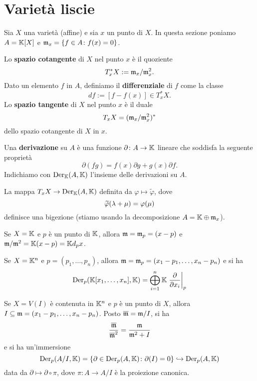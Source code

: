 \section{Variet\`a liscie}
\begin{notation}
Sia $X$ una varietà (affine) e sia $x$ un punto di $X$. In questa sezione poniamo $A=\mathbb{K}[X]$ e $\mathfrak{m}_x=\{f\in A\colon f(x)=0\}$.
\end{notation}


\begin{definition}
    Lo \textbf{spazio cotangente} di $X$ nel punto $x$ è il quoziente 
    \[T^\ast_x X:= \mathfrak{m}_x/\mathfrak{m}_x^2.\]
    Dato un elemento $f$ in $A$, definiamo il \textbf{differenziale} di $f$ come la classe 
    \[df:= [f-f(x)]\in T^\ast_x X.\] 
    Lo \textbf{spazio tangente} di $X$ nel punto $x$ è il duale 
    \[T_x X=(\mathfrak{m}_x/\mathfrak{m}_x^2)^\ast\]
    dello spazio cotangente di $X$ in $x$.
\end{definition}

\begin{definition}
    Una \textbf{derivazione} su $A$ è una funzione $\partial\colon A \to \mathbb{K}$ lineare che soddisfa la seguente proprietà \[\partial(fg)=f(x)\partial g + g(x)\partial f.\]
    Indichiamo con $\operatorname{Der}_{\mathbb{K}}(A,\mathbb{K})$ l'insieme delle derivazioni su $A$.
\end{definition}

\begin{exercise}
    La mappa $T_xX \to \operatorname{Der}_{\mathbb{K}}(A,\mathbb{K})$ definita da $\varphi\mapsto \widetilde{\varphi}$, dove \[\widetilde{\varphi}(\lambda+\mu)=\varphi(\mu)\] definisce una bigezione (stiamo usando la decomposizione $A=\mathbb{K}\oplus \mathfrak{m}_x$).
\end{exercise}

\begin{example}
    Se $X=\mathbb{K}$ e $p$ è un punto di $\mathbb{K}$, allora $\mathfrak{m}=\mathfrak{m}_p=(x-p)$ e $\mathfrak{m}/\mathfrak{m}^2=\mathbb{K}(x-p)=\mathbb{K} d_p x$.
\end{example}

\begin{example}
    Se $X=\mathbb{K}^n$ e $p=(p_1,\ldots,p_n)$, allora $\mathfrak{m}=\mathfrak{m}_p=(x_1-p_1,\ldots,x_n-p_n)$ e si ha \[\operatorname{Der}_p(\mathbb{K}[x_1,\ldots,x_n],\mathbb{K})=\bigoplus_{i=1}^n \mathbb{K} \left.\frac{\partial}{\partial x_i}\right\lvert_{p}\]
\end{example}

\begin{example}
    Se $X=V(I)$ è contenuta in $\mathbb{K}^n$ e $p$ è un punto di $X$, allora $I\subseteq \mathfrak{m}=(x_1-p_1,\ldots,x_n-p_n)$. Posto $\overline{\mathfrak{m}}=\mathfrak{m}/I$, si ha \[\frac{\overline{\mathfrak{m}}}{\overline{\mathfrak{m}}^2}=\frac{\mathfrak{m}}{\mathfrak{m}^2+I} \] e si ha un'immersione 
    \[\operatorname{Der}_p(A/I,\mathbb{K})=\left\{\partial\in \operatorname{Der}_p(A,\mathbb{K}) \colon \partial(I)=0\right\}\hookrightarrow \operatorname{Der}_p(A,\mathbb{K}) \]
    data da $\partial\mapsto \partial\circ \pi$, dove $\pi\colon A \to A/I$ è la proiezione canonica.
\end{example}

